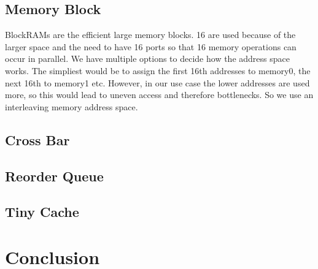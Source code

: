 \subsection{Memory Block}
BlockRAMs are the efficient large memory blocks. 16 are used because of the larger space and the need to have 16 ports so that 16 memory operations can occur 
in parallel. We have multiple options to decide how the address space works. The simpliest would be to assign the first 16th addresses to memory0, the next 16th to memory1 etc. However, in our use case the lower addresses are used more, so this would lead to uneven access and therefore bottlenecks. So we use an interleaving memory address space.
\subsection{Cross Bar}
\subsection{Reorder Queue}
\subsection{Tiny Cache}
\section{Conclusion}
